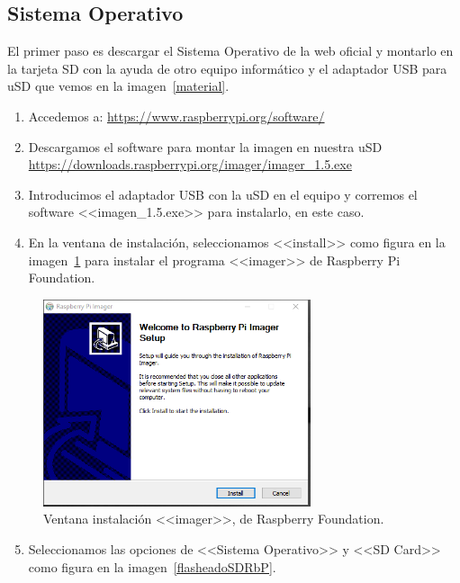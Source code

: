 \subsection{Sistema Operativo}
El primer paso es descargar el Sistema Operativo de la web oficial y montarlo en la tarjeta SD con la ayuda de otro equipo informático y el adaptador USB para uSD que vemos en la imagen~\ref{material}. 

\begin{enumerate}
    \item Accedemos a: \url{https://www.raspberrypi.org/software/}
    \item Descargamos el software para montar la imagen en nuestra uSD \url{https://downloads.raspberrypi.org/imager/imager_1.5.exe}
    \item Introducimos el adaptador USB con la uSD en el equipo y corremos el software <<imagen\_1.5.exe>> para instalarlo, en este caso.
    \item En la ventana de instalación, seleccionamos <<install>> como figura en la imagen~\ref{instalacionRaspbian} para instalar el programa <<imager>> de Raspberry Pi Foundation.
\end{enumerate}

\begin{figure}[h]
\centering
\includegraphics[width=0.7\textwidth]{img/fotos/instalacionRaspbian.PNG}
\caption{Ventana instalación <<imager>>, de Raspberry Foundation.}\label{instalacionRaspbian}
\end{figure}

\begin{enumerate}
\setcounter{enumi}{4}
    \item Seleccionamos las opciones de <<Sistema Operativo>> y <<SD Card>> como figura en la imagen~\ref{flasheadoSDRbP}.
\end{enumerate}

